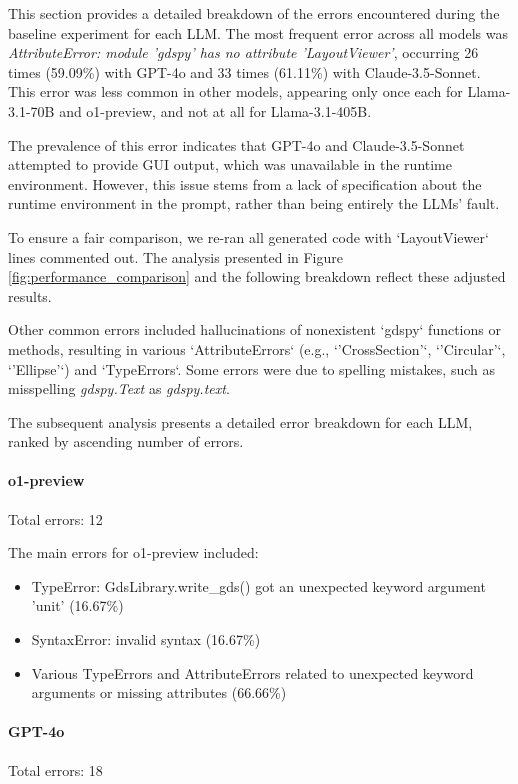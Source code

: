 \documentclass{article}
\begin{document}
This section provides a detailed breakdown of the errors encountered during the baseline experiment for each LLM. The most frequent error across all models was \textit{AttributeError: module 'gdspy' has no attribute 'LayoutViewer'}, occurring 26 times (59.09\%) with GPT-4o and 33 times (61.11\%) with Claude-3.5-Sonnet. This error was less common in other models, appearing only once each for Llama-3.1-70B and o1-preview, and not at all for Llama-3.1-405B.

The prevalence of this error indicates that GPT-4o and Claude-3.5-Sonnet attempted to provide GUI output, which was unavailable in the runtime environment. However, this issue stems from a lack of specification about the runtime environment in the prompt, rather than being entirely the LLMs' fault.

To ensure a fair comparison, we re-ran all generated code with `LayoutViewer` lines commented out. The analysis presented in Figure \ref{fig:performance_comparison} and the following breakdown reflect these adjusted results.

Other common errors included hallucinations of nonexistent `gdspy` functions or methods, resulting in various `AttributeErrors` (e.g., `'CrossSection'`, `'Circular'`, `'Ellipse'`) and `TypeErrors`. Some errors were due to spelling mistakes, such as misspelling \textit{gdspy.Text} as \textit{gdspy.text}.

The subsequent analysis presents a detailed error breakdown for each LLM, ranked by ascending number of errors.

\paragraph{o1-preview}
Total errors: 12

The main errors for o1-preview included:
\begin{itemize}
    \item TypeError: GdsLibrary.write\_gds() got an unexpected keyword argument 'unit' (16.67\%)
    \item SyntaxError: invalid syntax (16.67\%)
    \item Various TypeErrors and AttributeErrors related to unexpected keyword arguments or missing attributes (66.66\%)
\end{itemize}

\paragraph{GPT-4o}
Total errors: 18
\end{document}
